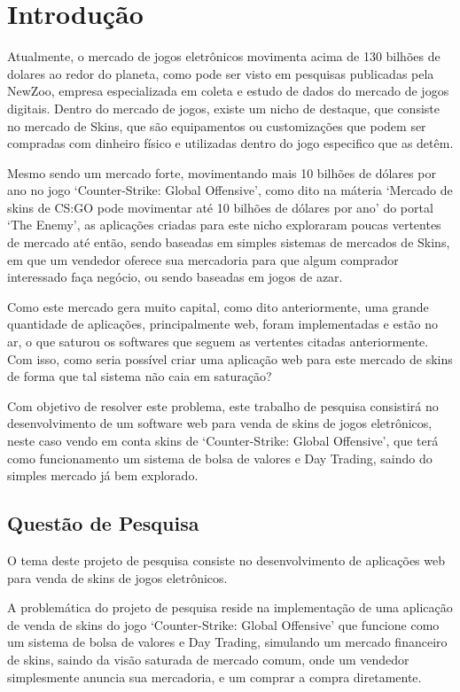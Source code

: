 
\chapter[Introdução]{Introdução}
Atualmente, o mercado de jogos eletrônicos movimenta acima de 130 bilhões de dolares ao redor do planeta, como pode ser visto em pesquisas publicadas pela NewZoo, empresa especializada em coleta e estudo de dados do mercado de jogos digitais. Dentro do mercado de jogos, existe um nicho de destaque, que consiste no mercado de Skins, que são equipamentos ou customizações que podem ser compradas com dinheiro físico e utilizadas dentro do jogo especifico que as detêm.

Mesmo sendo um mercado forte, movimentando mais 10 bilhões de dólares por ano no jogo ‘Counter-Strike: Global Offensive’, como dito na máteria ‘Mercado de skins de CS:GO pode movimentar até 10 bilhões de dólares por ano’ do portal ‘The Enemy’, as aplicações criadas para este nicho exploraram poucas vertentes de mercado até então, sendo baseadas em simples sistemas de mercados de Skins, em que um vendedor oferece sua mercadoria para que algum comprador interessado faça negócio, ou sendo baseadas em jogos de azar.

Como este mercado gera muito capital, como dito anteriormente, uma grande quantidade de aplicações, principalmente web, foram implementadas e estão no ar, o que saturou os softwares que seguem as vertentes citadas anteriormente. Com isso, como seria possível criar uma aplicação web para este mercado de skins de forma que tal sistema não caia em saturação?

Com objetivo de resolver este problema, este trabalho de pesquisa consistirá no desenvolvimento de um software web para venda de skins de jogos eletrônicos, neste caso vendo em conta skins de ‘Counter-Strike: Global Offensive’, que terá como funcionamento um sistema de bolsa de valores e Day Trading, saindo do simples mercado já bem explorado.

\section{Questão de Pesquisa}
O tema deste projeto de pesquisa consiste no desenvolvimento de aplicações web para venda de skins de jogos eletrônicos.

A problemática do projeto de pesquisa reside na implementação de uma aplicação de venda de skins do jogo ‘Counter-Strike: Global Offensive’ que funcione como um sistema de bolsa de valores e Day Trading, simulando um mercado financeiro de skins, saindo da visão saturada de mercado comum, onde um vendedor simplesmente anuncia sua mercadoria, e um comprar a compra diretamente.

